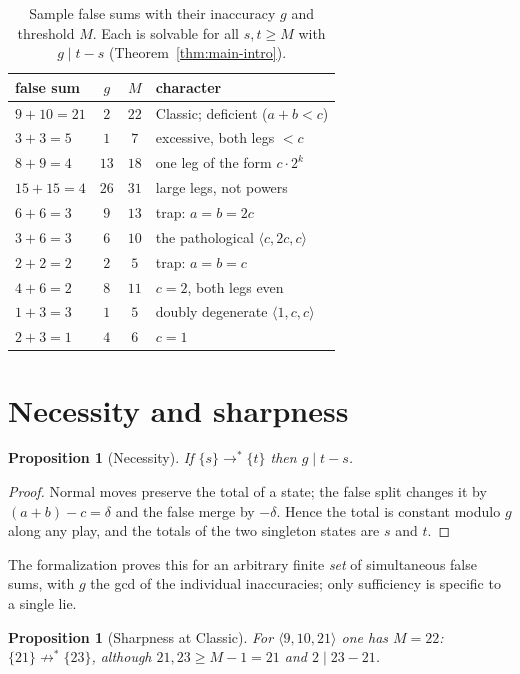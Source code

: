 \documentclass[11pt]{article}
\newtheorem{proposition}[theorem]{Proposition}
\theoremstyle{definition}
\theoremstyle{remark}
\newcommand{\lie}[3]{\langle #1,#2,#3\rangle}
\newcommand{\ms}[1]{\{#1\}}
\newcommand{\reach}{\longrightarrow^{*}}
\begin{document}
\begin{table}[t]
\centering
\begin{tabular}{lccl}
\toprule
false sum & $g$ & $M$ & character \\
\midrule
$9+10=21$ & $2$ & $22$ & Classic; deficient ($a+b<c$) \\
$3+3=5$ & $1$ & $7$ & excessive, both legs $<c$ \\
$8+9=4$ & $13$ & $18$ & one leg of the form $c\cdot 2^k$ \\
$15+15=4$ & $26$ & $31$ & large legs, not powers \\
$6+6=3$ & $9$ & $13$ & trap: $a=b=2c$ \\
$3+6=3$ & $6$ & $10$ & the pathological $\lie{c}{2c}{c}$ \\
$2+2=2$ & $2$ & $5$ & trap: $a=b=c$ \\
$4+6=2$ & $8$ & $11$ & $c=2$, both legs even \\
$1+3=3$ & $1$ & $5$ & doubly degenerate $\lie{1}{c}{c}$ \\
$2+3=1$ & $4$ & $6$ & $c=1$ \\
\bottomrule
\end{tabular}
\caption{Sample false sums with their inaccuracy $g$ and threshold $M$.
Each is solvable for all $s,t\ge M$ with $g\mid t-s$
(Theorem~\ref{thm:main-intro}).}\label{tab:examples}
\end{table}

\section{Necessity and sharpness}\label{sec:necessity}

\begin{proposition}[Necessity]\label{prop:necessity}
If $\ms{s}\reach\ms{t}$ then $g\mid t-s$.
\end{proposition}

\begin{proof}
Normal moves preserve the total of a state; the false split changes it by
$(a+b)-c=\delta$ and the false merge by $-\delta$.  Hence the total is
constant modulo $g$ along any play, and the totals of the two singleton
states are $s$ and $t$.
\end{proof}

The formalization proves this for an arbitrary finite \emph{set} of
simultaneous false sums, with $g$ the gcd of the individual inaccuracies;
only sufficiency is specific to a single lie.

\begin{proposition}[Sharpness at Classic]\label{prop:sharp}
For $\lie{9}{10}{21}$ one has $M=22$: \ $\ms{21}\not\reach\ms{23}$, although
$21,23\ge M-1=21$ and $2\mid 23-21$.
\end{proposition}
\end{document}
